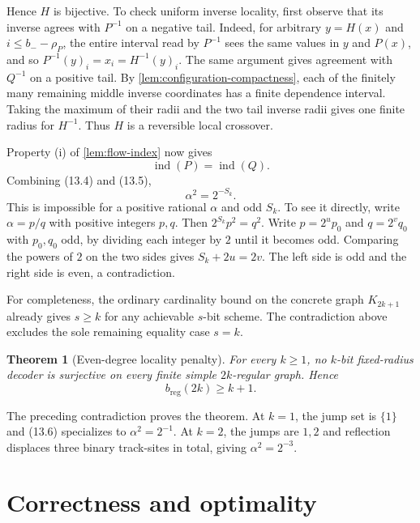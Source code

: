\documentclass[11pt]{article}
\newtheorem{theorem}{Theorem}[section]
\theoremstyle{definition}
\theoremstyle{remark}
\begin{document}
Hence $H$ is bijective.  To check uniform inverse locality, first observe
that its inverse agrees with $P^{-1}$ on a negative tail.  Indeed,
for arbitrary $y=H(x)$ and $i\le b_--\rho_P$, the entire interval
read by $P^{-1}$ sees the same values in $y$ and $P(x)$, and so
$P^{-1}(y)_i=x_i=H^{-1}(y)_i$.  The same argument gives agreement
with $Q^{-1}$ on a positive tail.  By
\cref{lem:configuration-compactness}, each of the finitely many remaining
middle inverse coordinates has a finite dependence interval.  Taking the
maximum of their radii and the two tail inverse radii gives one finite
radius for $H^{-1}$.  Thus $H$ is a reversible local crossover.

Property (i) of \cref{lem:flow-index} now gives
\[
                         \operatorname{ind}(P)
                         =\operatorname{ind}(Q).              \tag{13.5}
\]
Combining (13.4) and (13.5),
\[
                              \alpha^2=2^{-S_k}.              \tag{13.6}
\]
This is impossible for a positive rational $\alpha$ and odd $S_k$.
To see it directly, write $\alpha=p/q$ with positive integers $p,q$.
Then $2^{S_k}p^2=q^2$.  Write $p=2^u p_0$ and $q=2^v q_0$ with
$p_0,q_0$ odd, by dividing each integer by $2$ until it becomes odd.
Comparing the powers of $2$ on the two sides gives
$S_k+2u=2v$.  The left side is odd and the right side is even, a
contradiction.

For completeness, the ordinary cardinality bound on the concrete graph
$K_{2k+1}$ already gives $s\ge k$ for any achievable $s$-bit scheme.  The
contradiction above excludes the sole remaining equality case $s=k$.

\begin{theorem}[Even-degree locality penalty]
\label{thm:even-lower}
For every $k\ge1$, no $k$-bit fixed-radius decoder is surjective on every
finite simple $2k$-regular graph.  Hence
\[
                         b_{\mathrm{reg}}(2k)\ge k+1.
\]
\end{theorem}

The preceding contradiction proves the theorem.  At $k=1$, the jump set is
$\{1\}$ and (13.6) specializes to
$\alpha^2=2^{-1}$.  At $k=2$, the jumps are $1,2$ and reflection displaces
three binary track-sites in total, giving $\alpha^2=2^{-3}$.

\section{Correctness and optimality}
\label{sec:conclusion}
\end{document}
